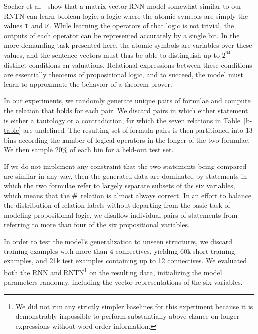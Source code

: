 Socher et al.~ show that a matrix-vector RNN
model somewhat similar to our RNTN can learn boolean logic, 
a logic where the atomic symbols are simply the
values $\texttt{T}$ and $\texttt{F}$. While learning the operators of that logic is not trivial, the outputs of
each operator can be represented accurately by a single bit.
In the more demanding task presented here, the atomic symbols are variables over these values, and the sentence vectors must thus be able to distinguish up to $2^{64}$ distinct conditions on valuations. Relational expressions between these conditions are essentially theorems of propositional logic, and to succeed, the model must learn to approximate the behavior of a theorem prover.

In our experiments, we randomly generate unique pairs 
of formulae and compute the relation that holds for each pair.
We discard pairs in which either statement is either a tautology or a
contradiction, for which the seven relations in
Table~\ref{b-table} are undefined. The resulting set of formula pairs is
then partitioned into 13 bins according the number of logical operators in
the longer of the two formulae. We then sample 20\% of each
bin for a held-out test set.

If we do not implement any constraint that the two statements being
compared are similar in any way, then the generated data are dominated
by statements in which the two formulae refer to largely separate
subsets of the six variables, which means that the $\mathbin{\#}$ relation
is almost always correct.  In an effort to balance the distribution of
relation labels without departing from the basic task of modeling
propositional logic, we disallow individual pairs of statements from
referring to more than four of the six propositional variables.

In order to test the model's generalization to unseen structures, we discard
training examples with more than 4 connectives, yielding 60k short training examples,
and 21k test examples containing up to 12 connectives.
We evaluated both the RNN and RNTN\footnote{We did not run any strictly simpler baselines for this experiment because it is demonstrably impossible to perform substantially above chance on longer expressions without word order information.} on the resulting data, initializing the model parameters randomly,
including the vector representations of the six variables.


